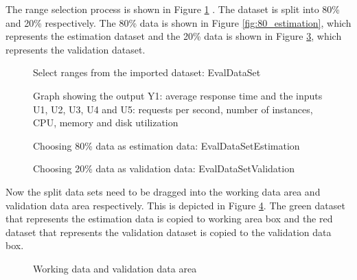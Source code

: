 \documentclass[article,type=msc,colorback,12pt,accentcolor=tud8b,table]{tudthesis}
\begin{document}
The range selection process is shown in Figure \ref{fig:select_range_estimation_validation} . The dataset is split into 80\% and 20\% respectively. The 80\% data is shown in Figure \ref{fig:80_estimation}, which represents the estimation dataset and the 20\% data is shown in Figure \ref{fig:20_validation}, which represents the validation dataset. 

\begin{figure}[H]
	\begin{center}
		\makebox[\textwidth]{\texttt{[image: E7]}}
	\end{center}
	\caption{Select ranges from the imported dataset: EvalDataSet}
		\label{fig:select_range_estimation_validation}
\end{figure}

\begin{figure}[H]
	\begin{center}
	\end{center}
	\caption{Graph showing the output Y1: average response time and the inputs U1, U2, U3, U4 and U5: requests per second, number of instances, CPU, memory and disk utilization }
	\label{fig:output_responsetime_input_5}
\end{figure}

  \begin{figure}[H]
	  	  	  	\begin{center}
	  	  	  		\makebox[\textwidth]{\texttt{[image: E8]}}
	  	  	  	\end{center}
	  	  	  	\caption{Choosing 80\% data as estimation data: EvalDataSetEstimation}
					\label{fig:80_estimation}
    	\begin{center}
    		\makebox[\textwidth]{\texttt{[image: E9]}}
    	\end{center}
    	\caption{Choosing 20\% data as validation data: EvalDataSetValidation}
    	\label{fig:20_validation}
    \end{figure}	
	
	Now the split data sets need to be dragged into the working data area and validation data area respectively. This is depicted in Figure \ref{fig:working_validation_area}. The green dataset that represents the estimation data is copied to working area box and the red dataset that represents the validation dataset is copied to the validation data box.
	
	    \begin{figure}[H]
	    	\begin{center}
	    		\makebox[\textwidth]{\texttt{[image: E10]}}
	    	\end{center}
	    	\caption{Working data and validation data area}
	    		\label{fig:working_validation_area}
	    \end{figure}
	
\end{document}
